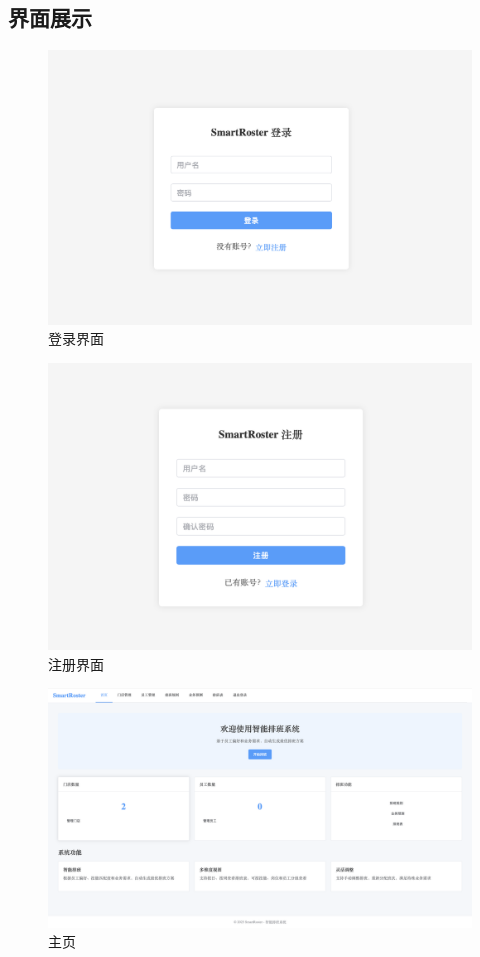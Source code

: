 \documentclass{ctexart}
\begin{document}
\subsection{界面展示}
\begin{figure}[H]
    \centering
    \includegraphics[width=0.8\linewidth]{./source/登录界面.png}
    \caption{登录界面}
    \label{fig:microservice-arch}
\end{figure}
\begin{figure}[H]
    \centering
    \includegraphics[width=0.8\linewidth]{./source/注册界面.png}
    \caption{注册界面}
    \label{fig:microservice-arch}
\end{figure}
\begin{figure}[H]
    \centering
    \includegraphics[width=0.8\linewidth]{./source/主页.png}
    \caption{主页}
    \label{fig:microservice-arch}
\end{figure}
\end{document}
